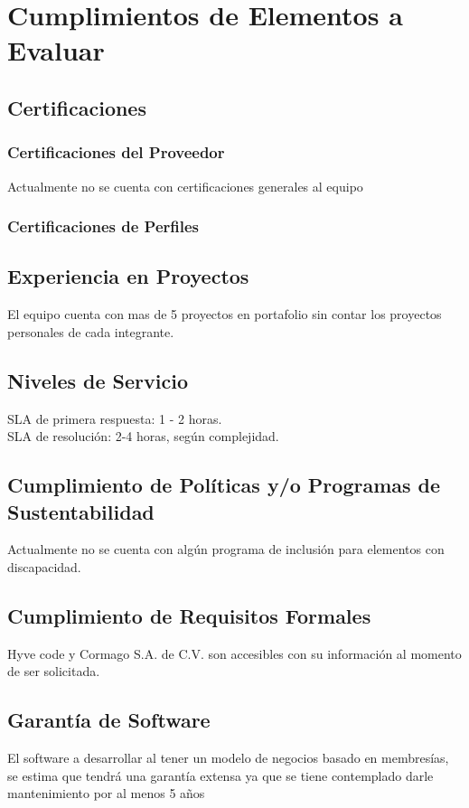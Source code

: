 \documentclass{report}
\begin{document}
	
	
	\chapter{Cumplimientos de Elementos a Evaluar}
		\section{Certificaciones}
			\subsection{Certificaciones del Proveedor}
			Actualmente no se cuenta con certificaciones generales al equipo
			\subsection{Certificaciones de Perfiles}
			
		\section{Experiencia en Proyectos}
			El equipo cuenta con mas de 5 proyectos en portafolio sin contar los proyectos personales de cada integrante.
			
		\section{Niveles de Servicio}
			SLA de primera respuesta: 1 - 2 horas.\\
			SLA de resolución: 2-4 horas, según complejidad.
			
		\section{Cumplimiento de Políticas y/o Programas de Sustentabilidad}
			Actualmente no se cuenta con algún programa de inclusión para elementos con discapacidad.
		\section{Cumplimiento de Requisitos Formales}		
			Hyve code y Cormago S.A. de C.V. son accesibles con su información al momento de ser solicitada.
		\section{Garantía de Software}
			El software a desarrollar al tener un modelo de negocios basado en membresías, se estima que tendrá una garantía extensa ya que se tiene contemplado darle mantenimiento por al menos 5 años
\end{document}
